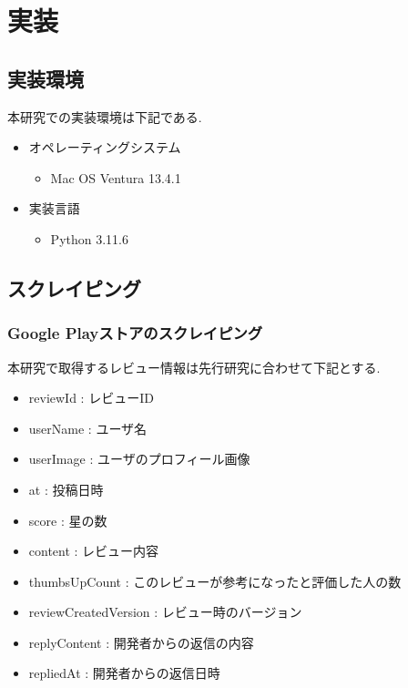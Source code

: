 \chapter{実装}
\label{chap:zisso}


\section{実装環境}
本研究での実装環境は下記である. 

\begin{itemize}
 \item オペレーティングシステム
    \begin{itemize}
      \item Mac OS Ventura 13.4.1
    \end{itemize}
 \item 実装言語
    \begin{itemize}
      \item Python 3.11.6
    \end{itemize}
\end{itemize}


\section{スクレイピング}
\subsection{Google Playストアのスクレイピング}
本研究で取得するレビュー情報は先行研究\cite{kawatsura}に合わせて下記とする. 

\begin{itemize}
 \item reviewId : レビューID
 \item userName : ユーザ名
 \item userImage : ユーザのプロフィール画像
 \item at : 投稿日時
 \item score : 星の数
 \item content : レビュー内容
 \item thumbsUpCount : このレビューが参考になったと評価した人の数
 \item reviewCreatedVersion : レビュー時のバージョン
 \item replyContent : 開発者からの返信の内容
 \item repliedAt : 開発者からの返信日時
\end{itemize}

